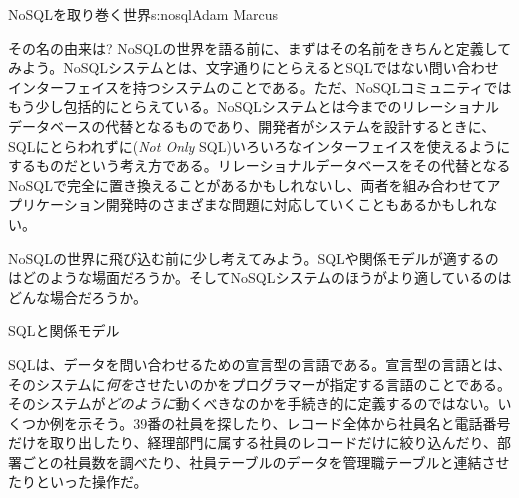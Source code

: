\begin{aosachapter}{NoSQLを取り巻く世界}{s:nosql}{Adam Marcus}
\begin{aosasect1}{その名の由来は?}
NoSQLの世界を語る前に、まずはその名前をきちんと定義してみよう。NoSQLシステムとは、文字通りにとらえるとSQLではない問い合わせインターフェイスを持つシステムのことである。ただ、NoSQLコミュニティではもう少し包括的にとらえている。NoSQLシステムとは今までのリレーショナルデータベースの代替となるものであり、開発者がシステムを設計するときに、SQLにとらわれずに(\emph{Not Only} SQL)いろいろなインターフェイスを使えるようにするものだという考え方である。リレーショナルデータベースをその代替となるNoSQLで完全に置き換えることがあるかもしれないし、両者を組み合わせてアプリケーション開発時のさまざまな問題に対応していくこともあるかもしれない。

NoSQLの世界に飛び込む前に少し考えてみよう。SQLや関係モデルが適するのはどのような場面だろうか。そしてNoSQLシステムのほうがより適しているのはどんな場合だろうか。

\begin{aosasect2}{SQLと関係モデル}

SQLは、データを問い合わせるための宣言型の言語である。宣言型の言語とは、そのシステムに\emph{何を}させたいのかをプログラマーが指定する言語のことである。そのシステムが\emph{どのように}動くべきなのかを手続き的に定義するのではない。いくつか例を示そう。39番の社員を探したり、レコード全体から社員名と電話番号だけを取り出したり、経理部門に属する社員のレコードだけに絞り込んだり、部署ごとの社員数を調べたり、社員テーブルのデータを管理職テーブルと連結させたりといった操作だ。


\end{aosasect2}
\end{aosasect1}
\end{aosachapter}
